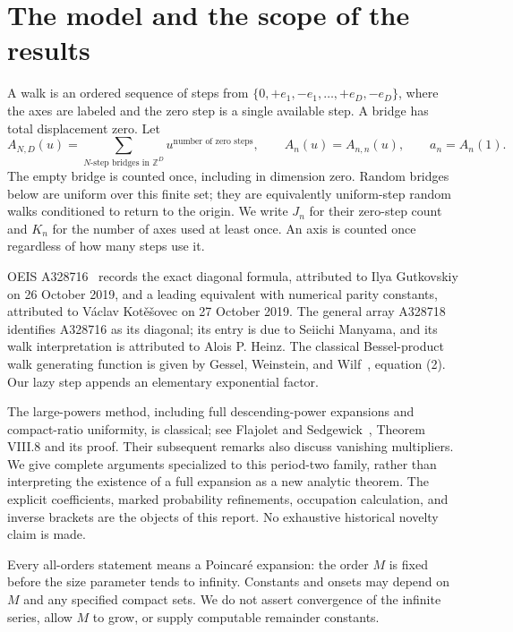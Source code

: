 \documentclass[11pt,letterpaper]{article}
\theoremstyle{remark}\newtheorem{remark}[theorem]{Remark}
\begin{document}
\section{The model and the scope of the results}\label{lcw:sec:scope}
A walk is an ordered sequence of steps from
$\{0,+e_1,-e_1,\ldots,+e_D,-e_D\}$, where the axes are labeled and the zero step is a single available step. A bridge has total displacement zero. Let
\[
 A_{N,D}(u)=\sum_{\text{$N$-step bridges in $\mathbb Z^D$}}u^{\text{number of zero steps}},
 \qquad A_n(u)=A_{n,n}(u),\qquad a_n=A_n(1).
\]
The empty bridge is counted once, including in dimension zero. Random bridges below are uniform over this finite set; they are equivalently uniform-step random walks conditioned to return to the origin. We write $J_n$ for their zero-step count and $K_n$ for the number of axes used at least once. An axis is counted once regardless of how many steps use it.

OEIS A328716~\cite{oeis} records the exact diagonal formula, attributed to Ilya Gutkovskiy on 26 October 2019, and a leading equivalent with numerical parity constants, attributed to V\'aclav Kot\v e\v sovec on 27 October 2019. The general array A328718~\cite{array} identifies A328716 as its diagonal; its entry is due to Seiichi Manyama, and its walk interpretation is attributed to Alois P. Heinz. The classical Bessel-product walk generating function is given by Gessel, Weinstein, and Wilf~\cite{gww}, equation (2). Our lazy step appends an elementary exponential factor.

The large-powers method, including full descending-power expansions and compact-ratio uniformity, is classical; see Flajolet and Sedgewick~\cite{fs}, Theorem VIII.8 and its proof. Their subsequent remarks also discuss vanishing multipliers. We give complete arguments specialized to this period-two family, rather than interpreting the existence of a full expansion as a new analytic theorem. The explicit coefficients, marked probability refinements, occupation calculation, and inverse brackets are the objects of this report. No exhaustive historical novelty claim is made.

Every all-orders statement means a Poincar\'e expansion: the order $M$ is fixed before the size parameter tends to infinity. Constants and onsets may depend on $M$ and any specified compact sets. We do not assert convergence of the infinite series, allow $M$ to grow, or supply computable remainder constants.
\end{document}
